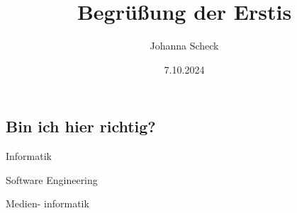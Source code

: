 \documentclass[
	aspectratio=169, %
	11pt %
]{beamer}
\title[Begrüßung]{Begrüßung der Erstis} %
\author[Johanna]{Johanna Scheck} %
\date{7.10.2024} %
\begin{document}

	

\subsection{Bin ich hier richtig?}
\begin{frame}{\insertsubsection}
	\begin{fancycolumns}[columns=3]
		\begin{Info}{} \begin{minipage}[c][2cm][c]{\textwidth}
            \centering
            \huge Informatik
        \end{minipage}\end{Info}
		\nextcolumn
		\begin{SE}{} \begin{minipage}[c][2cm][c]{\textwidth}
            \centering
            \huge Software Engineering
        \end{minipage}\end{SE}	
		\nextcolumn
		\begin{MI}{} \begin{minipage}[c][2cm][c]{\textwidth}
            \centering
            \huge Medien- informatik
        \end{minipage}\end{MI}	
	\end{fancycolumns}
\end{frame}
\end{document}

